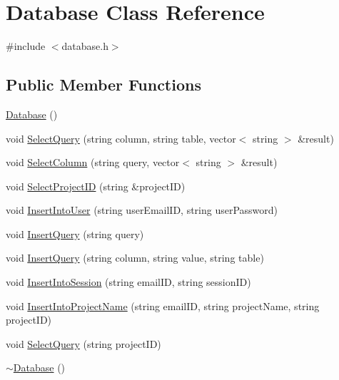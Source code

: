 \hypertarget{classDatabase}{\section{Database Class Reference}
\label{classDatabase}
}


{\ttfamily \#include $<$database.\-h$>$}

\subsection*{Public Member Functions}
\begin{DoxyCompactItemize}
\item 
\hyperlink{classDatabase_a4703c80e6969d33565ea340f768fdadf}{Database} ()
\item 
void \hyperlink{classDatabase_aec3d0f84e49a58a59f254c90193c1303}{Select\-Query} (string column, string table, vector$<$ string $>$ \&result)
\item 
void \hyperlink{classDatabase_a6fb9e249cb97830af86c00804bb209a2}{Select\-Column} (string query, vector$<$ string $>$ \&result)
\item 
void \hyperlink{classDatabase_a20f7ccadac8f3b67d4344f7da4594eda}{Select\-Project\-I\-D} (string \&project\-I\-D)
\item 
void \hyperlink{classDatabase_a62ef4b0467047a68718dcc41a1851684}{Insert\-Into\-User} (string user\-Email\-I\-D, string user\-Password)
\item 
void \hyperlink{classDatabase_a63d8c1af7507b1dcdc81a411f9a0b4b4}{Insert\-Query} (string query)
\item 
void \hyperlink{classDatabase_a513326ea43b2455177731fbc92c4bf4f}{Insert\-Query} (string column, string value, string table)
\item 
void \hyperlink{classDatabase_a8d7a5fe5f7b24d41ed165bc2fa565337}{Insert\-Into\-Session} (string email\-I\-D, string session\-I\-D)
\item 
void \hyperlink{classDatabase_a1f9b19ec52568cd279e3a4408771b5bb}{Insert\-Into\-Project\-Name} (string email\-I\-D, string project\-Name, string project\-I\-D)
\item 
void \hyperlink{classDatabase_ad9d81a21631f250d487d1f9e6956f3df}{Select\-Query} (string project\-I\-D)
\item 
\hyperlink{classDatabase_a84d399a2ad58d69daab9b05330e1316d}{$\sim$\-Database} ()
\end{DoxyCompactItemize}
